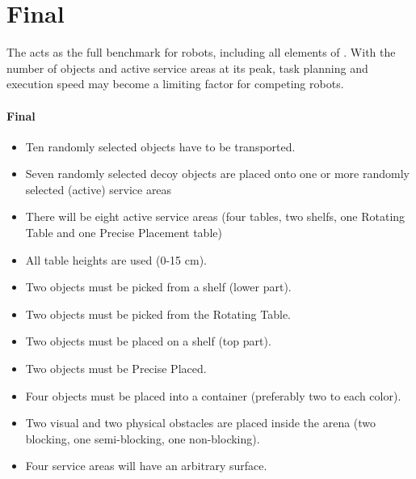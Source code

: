 \section{Final}
\label{sec:Final}

The  acts as the full benchmark for robots, including all elements of \RCAW.
With the number of objects and active service areas at its peak, task planning and execution speed may become a limiting factor for competing robots. 

\paragraph{Final}
\begin{itemize}
\item Ten randomly selected objects have to be transported.
\item Seven randomly selected decoy objects are placed onto one or more randomly selected (active) service areas
\item There will be eight active service areas (four tables,  two shelfs, one Rotating Table and one Precise Placement table)
\item All table heights are used (0-15 $\si{\centi\meter}$).
\item Two objects must be picked from a shelf (lower part).
\item Two objects must be picked from the Rotating Table.
\item Two objects must be placed on a shelf (top part).
\item Two objects must be Precise Placed.
\item Four objects must be placed into a container (preferably two to each color).
\item Two visual and two physical obstacles are placed inside the arena (two blocking, one semi-blocking, one non-blocking).
\item Four service areas will have an arbitrary surface.
\end{itemize}